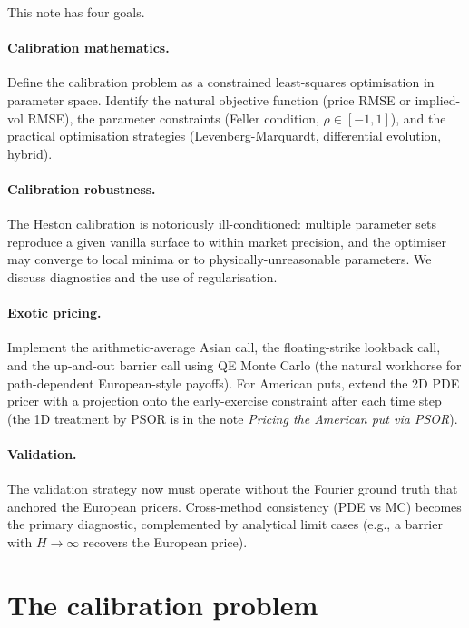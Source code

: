 \documentclass[11pt]{article}
\theoremstyle{plain}
\theoremstyle{definition}
\theoremstyle{remark}
\begin{document}
This note has four goals.

\paragraph{Calibration mathematics.} Define the calibration problem as a constrained least-squares optimisation in parameter space. Identify the natural objective function (price RMSE or implied-vol RMSE), the parameter constraints (Feller condition, $\rho \in [-1, 1]$), and the practical optimisation strategies (Levenberg-Marquardt, differential evolution, hybrid).

\paragraph{Calibration robustness.} The Heston calibration is notoriously ill-conditioned: multiple parameter sets reproduce a given vanilla surface to within market precision, and the optimiser may converge to local minima or to physically-unreasonable parameters. We discuss diagnostics and the use of regularisation.

\paragraph{Exotic pricing.} Implement the arithmetic-average Asian call, the floating-strike lookback call, and the up-and-out barrier call using QE Monte Carlo (the natural workhorse for path-dependent European-style payoffs). For American puts, extend the 2D PDE pricer with a projection onto the early-exercise constraint after each time step (the 1D treatment by PSOR is in the note \emph{Pricing the American put via PSOR}).

\paragraph{Validation.} The validation strategy now must operate without the Fourier ground truth that anchored the European pricers. Cross-method consistency (PDE vs MC) becomes the primary diagnostic, complemented by analytical limit cases (e.g., a barrier with $H \to \infty$ recovers the European price).

\section{The calibration problem}
\end{document}
